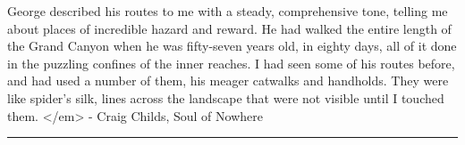 George described his routes to me with a steady, comprehensive tone,
telling me about places of incredible hazard and reward.  He had walked
the entire length of the Grand Canyon when he was fifty-seven years old,
in eighty days, all of it done in the puzzling confines of the inner
reaches.  I had seen some of his routes before, and had used a number
of them, his meager catwalks and handholds.  They were like spider's silk,
lines across the landscape that were not visible until I touched them.
</em> - Craig Childs, Soul of Nowhere

\par\noindent\rule{\textwidth}{0.4pt}

